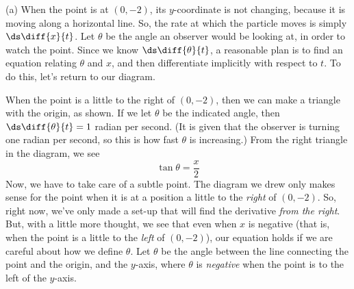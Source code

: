 \begin{solution}
(a) When the point is at $(0,-2)$, its $y$-coordinate is not changing, because it is moving along a horizontal line. So, the rate at which the particle moves is simply $\ds\diff{x}{t}$. Let $\theta$ be the angle an observer would be looking at, in order to watch the point.
Since we know $\ds\diff{\theta}{t}$, a reasonable plan is to find an equation relating $\theta$ and $x$, and then differentiate implicitly with respect to $t$. To do this, let's return to our diagram.

\begin{center}\end{center}

When the point is a little to the right of $(0,-2)$, then we can make a triangle with the origin, as shown. If we let $\theta$ be the indicated angle, then $\ds\diff{\theta}{t}=1$ radian per second. (It is given that the observer is turning one radian per second, so this is how fast $\theta$ is increasing.) From the right triangle in the diagram, we see
\[\tan\theta=\frac{x}{2}\]
Now, we have to take care of a subtle point. The diagram we drew only makes sense for the point when it is at a position a little to the \emph{right} of $(0,-2)$. So, right now, we've only made a set-up that will find the derivative \emph{from the right}. But, with a little more thought, we see that even when $x$ is negative (that is, when the point is a little to the \emph{left} of $(0,-2)$), our equation holds if we are careful about how we define $\theta$. Let $\theta$ be  the angle between the line connecting the point and the origin, and the $y$-axis, where $\theta$ is \emph{negative} when the point is to the left of the $y$-axis.


\begin{center}\end{center}


\end{solution}
